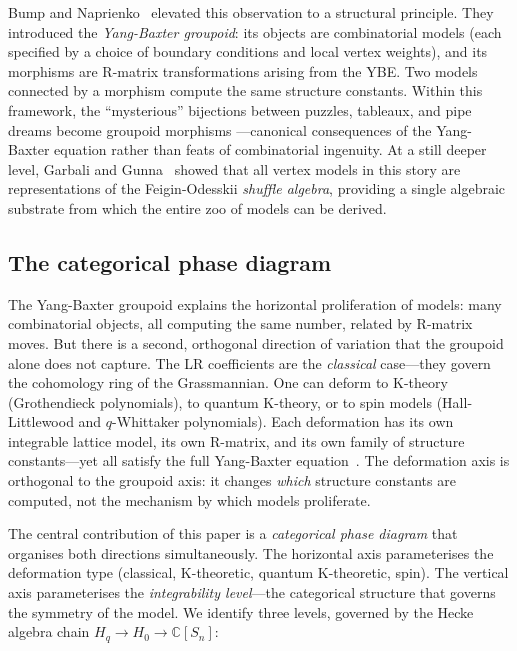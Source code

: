 Bump and Naprienko~\cite{bump-naprienko-2025} elevated this observation to a
structural principle.  They introduced the \emph{Yang-Baxter groupoid}: its
objects are combinatorial models (each specified by a choice of boundary
conditions and local vertex weights), and its morphisms are R-matrix
transformations arising from the YBE.  Two models connected by a morphism
compute the same structure constants.  Within this framework, the ``mysterious''
bijections between puzzles, tableaux, and pipe dreams become groupoid morphisms
---canonical consequences of the Yang-Baxter equation rather than feats of
combinatorial ingenuity.  At a still deeper level, Garbali and
Gunna~\cite{garbali-gunna-2024} showed that all vertex models in this story
are representations of the Feigin-Odesskii \emph{shuffle algebra}, providing a
single algebraic substrate from which the entire zoo of models can be derived.

\subsection*{The categorical phase diagram}

The Yang-Baxter groupoid explains the horizontal proliferation of models: many
combinatorial objects, all computing the same number, related by R-matrix moves.
But there is a second, orthogonal direction of variation that the groupoid alone
does not capture.  The LR coefficients are the \emph{classical} case---they
govern the cohomology ring of the Grassmannian.  One can deform to K-theory
(Grothendieck polynomials), to quantum K-theory, or to spin models
(Hall-Littlewood and $q$-Whittaker polynomials).  Each deformation has its own
integrable lattice model, its own R-matrix, and its own family of structure
constants---yet all satisfy the full Yang-Baxter
equation~\cite{wheeler-zinn-justin-2016, gunna-wheeler-zj-2025}.  The
deformation axis is orthogonal to the groupoid axis: it changes \emph{which}
structure constants are computed, not the mechanism by which models proliferate.

The central contribution of this paper is a \emph{categorical phase diagram}
that organises both directions simultaneously.  The horizontal axis parameterises
the deformation type (classical, K-theoretic, quantum K-theoretic, spin).  The
vertical axis parameterises the \emph{integrability level}---the categorical
structure that governs the symmetry of the model.  We identify three levels,
governed by the Hecke algebra chain $H_q \to H_0 \to \mathbb{C}[S_n]$:

